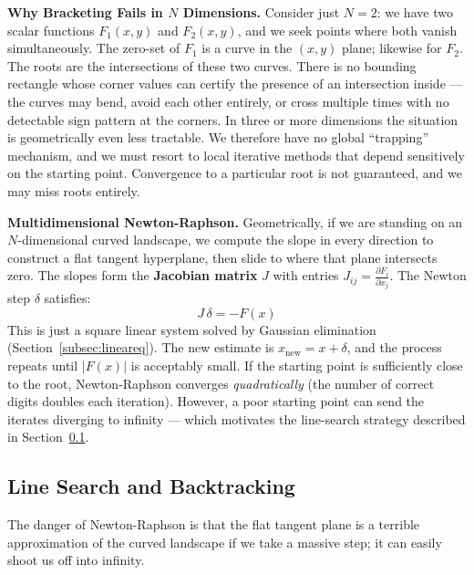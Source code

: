\documentclass[12pt, a4paper]{article}
\begin{document}
\textbf{Why Bracketing Fails in $N$ Dimensions.} Consider just $N=2$: we have two scalar functions $F_1(x,y)$ and $F_2(x,y)$, and we seek points where both vanish simultaneously. The zero-set of $F_1$ is a curve in the $(x,y)$ plane; likewise for $F_2$. The roots are the intersections of these two curves. There is no bounding rectangle whose corner values can certify the presence of an intersection inside --- the curves may bend, avoid each other entirely, or cross multiple times with no detectable sign pattern at the corners. In three or more dimensions the situation is geometrically even less tractable. We therefore have no global ``trapping'' mechanism, and we must resort to local iterative methods that depend sensitively on the starting point. Convergence to a particular root is not guaranteed, and we may miss roots entirely.

\textbf{Multidimensional Newton-Raphson.} Geometrically, if we are standing on an $N$-dimensional curved landscape, we compute the slope in every direction to construct a flat tangent hyperplane, then slide to where that plane intersects zero.
The slopes form the \textbf{Jacobian matrix} $J$ with entries $J_{ij} = \frac{\partial F_i}{\partial x_j}$. The Newton step $\delta$ satisfies:
\begin{equation}
J\,\delta = -F(x)
\end{equation}
This is just a square linear system solved by Gaussian elimination (Section~\ref{subsec:lineareq}). The new estimate is $x_{\mathrm{new}} = x + \delta$, and the process repeats until $|F(x)|$ is acceptably small. If the starting point is sufficiently close to the root, Newton-Raphson converges \textit{quadratically} (the number of correct digits doubles each iteration). However, a poor starting point can send the iterates diverging to infinity --- which motivates the line-search strategy described in Section~\ref{subsec:linesearch}.

\subsection{Line Search and Backtracking}
\label{subsec:linesearch}
The danger of Newton-Raphson is that the flat tangent plane is a terrible approximation of the curved landscape if we take a massive step; it can easily shoot us off into infinity.
\end{document}

